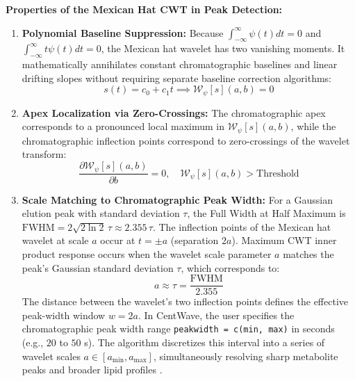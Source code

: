 \documentclass[11pt,twoside,openright]{book}
\begin{document}
\begin{svgraybox}
\textbf{Properties of the Mexican Hat CWT in Peak Detection:}\\
\begin{enumerate}
    \item \textbf{Polynomial Baseline Suppression:} Because $\int_{-\infty}^\infty \psi(t) dt = 0$ and $\int_{-\infty}^\infty t \psi(t) dt = 0$, the Mexican hat wavelet has two vanishing moments. It mathematically annihilates constant chromatographic baselines and linear drifting slopes without requiring separate baseline correction algorithms:
    \begin{equation*}
    s(t) = c_0 + c_1 t \implies \mathcal{W}_\psi[s](a, b) = 0
    \end{equation*}
    \item \textbf{Apex Localization via Zero-Crossings:} The chromatographic apex corresponds to a pronounced local maximum in $\mathcal{W}_\psi[s](a, b)$, while the chromatographic inflection points correspond to zero-crossings of the wavelet transform:
    \begin{equation*}
    \frac{\partial \mathcal{W}_\psi[s](a, b)}{\partial b} = 0, \quad \mathcal{W}_\psi[s](a, b) > \text{Threshold}
    \end{equation*}
    \item \textbf{Scale Matching to Chromatographic Peak Width:} For a Gaussian elution peak with standard deviation $\tau$, the Full Width at Half Maximum is $\text{FWHM} = 2\sqrt{2\ln 2} \, \tau \approx 2.355 \, \tau$. The inflection points of the Mexican hat wavelet at scale $a$ occur at $t = \pm a$ (separation $2a$). Maximum CWT inner product response occurs when the wavelet scale parameter $a$ matches the peak's Gaussian standard deviation $\tau$, which corresponds to:
    \begin{equation*}
    a \approx \tau = \frac{\text{FWHM}}{2.355}
    \end{equation*}
    The distance between the wavelet's two inflection points defines the effective peak-width window $w = 2a$. In CentWave, the user specifies the chromatographic peak width range \texttt{peakwidth = c(min, max)} in seconds (e.g., $20$ to $50$ s). The algorithm discretizes this interval into a series of wavelet scales $a \in [a_{\min}, a_{\max}]$, simultaneously resolving sharp metabolite peaks and broader lipid profiles \cite{tautenhahn2008highly}.
\end{enumerate}
\end{svgraybox}
\end{document}
